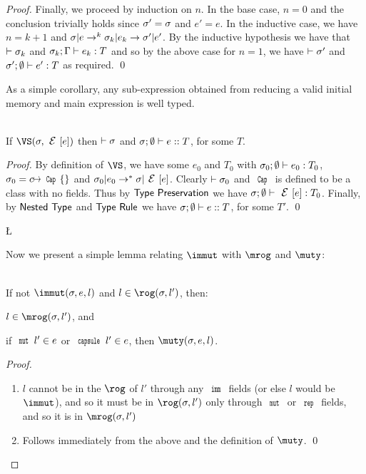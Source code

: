 \begin{proof}
	Finally, we proceed by induction on $n$. In the base case, $n = 0$ and
	the conclusion trivially holds since $\sigma' = \sigma$ and $e' = e$. In the
	inductive case, we have $n = k+1$ and $\sigma|e\rightarrow^{k}\sigma_k|e_k\rightarrow\sigma'|e'$.
	By the inductive hypothesis we have that $\vdash\sigma_k$ and $\ty[\s_k][\G]{e_k}T$
	and so by the above case for $n = 1$, we have $\vdash\sigma'$ and $\tyr[\s']{e'}T$
	as required.
	\qed\end{proof}


As a simple corollary, any sub-expression obtained from reducing a valid initial memory and main expression is well typed.

\SS\begin{Corollary}\ \\
	\indent If $\VS(\s,\E[e])$ then $\vdash\sigma$ and $\tyer eT$, for some $T$.
\end{Corollary}
\SS\begin{proof}
	By definition of $\VS$, we have some $e_0$ and $T_0$ with $\tyr[\s_0]{e_0}T_0$,
	$\s_0 = c\mapsto\Kw{Cap}\{\}$ and $\s_0|e_0\rightarrow^*\s|\E[e]$. Clearly
	$\vdash\sigma_0$ and $\Kw{Cap}$ is defined to be a class with no fields.
	Thus by $\textsf{Type Preservation}$ we have $\tyr {\E[e]}{T_0}$.
	Finally, by $\textsf{Nested Type}$ and $\textsf{Type Rule}$ we have
	$\tyer eT$, for some
	$T'$.
\qed\end{proof}

\L

Now we present a simple lemma relating $\immut$ with $\mrog$ and $\muty$:

\SS\begin{Lemma}\ \\
	\indent If not $\immut(\s,e,l)$ and $l\in\rog(\s,l')$, then:
	\begin{ienumerate}
		\item $l\in\mrog(\s,l')$, and
		\item if $\Kw{mut}\,l'\in e$ or $\Kw{capsule}\,l'\in e$, then $\muty(\s,e,l)$.
	\end{ienumerate}
\end{Lemma}
\SS\begin{proof}
	\SS\begin{enumerate}
		\item $l$ cannot be in the $\rog$ of $l'$ through any $\Kw{imm}$ fields (or else $l$ would be $\immut$), and so it must be in $\rog(\s,l')$ only through $\Kw{mut}$ or $\Kw{rep}$ fields, and so it is in $\mrog(\s,l')$
		\item Follows immediately from the above and the definition of $\muty$.
	\qed\end{enumerate}
\end{proof}

